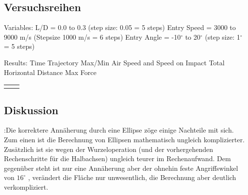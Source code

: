 \subsection{Versuchsreihen}
Variables:
L/D = 0.0 to 0.3 (step size: 0.05 = 5 steps)
Entry Speed = 3000 to 9000 m/s  (Stepsize 1000 m/s = 6 steps)
Entry Angle = -10$^{\circ}$ to 20$^{\circ}$ (step size: 1$^{\circ}$ = 5 steps) 

Results:
Time
Trajectory
Max/Min Air Speed and Speed on Impact
Total Horizontal Distance
Max Force

\begin{tabular}{|c|c|}
	\hline 
	&  \\ 
	\hline 
	&  \\ 
	\hline 
\end{tabular} 


\subsection{Diskussion} :Die korrektere Annäherung durch eine Ellipse zöge einige Nachteile mit sich. Zum einen ist die Berechnung von Ellipsen mathematisch ungleich komplizierter. Zusätzlich ist sie wegen der Wurzeloperation (und der vorhergehenden Rechenschritte für die Halbachsen) ungleich teurer im Rechenaufwand. Dem gegenüber steht ist nur eine Annäherung aber der ohnehin feste Angriffswinkel von $16^{\circ}$ \cite{Edquist2009}, verändert die Fläche nur unwesentlich, die Berechnung aber deutlich verkompliziert.